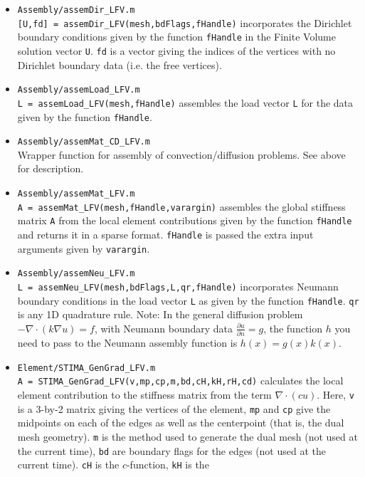 \documentclass[a4paper,10pt]{article}
\begin{document}
\begin{itemize}
\item {\tt Assembly/assemDir\_LFV.m} \\
    {\tt [U,fd] = assemDir\_LFV(mesh,bdFlags,fHandle)} incorporates the
    Dirichlet boundary conditions given by the function {\tt fHandle} in
    the Finite Volume solution vector {\tt U}. {\tt fd} is a vector
    giving the indices of the vertices with no Dirichlet boundary data
    (i.e. the free vertices).
\item {\tt Assembly/assemLoad\_LFV.m} \\
    {\tt L = assemLoad\_LFV(mesh,fHandle)} assembles the load vector {\tt L}
    for the data given by the function {\tt fHandle}.
\item {\tt Assembly/assemMat\_CD\_LFV.m} \\
    Wrapper function for assembly of convection/diffusion problems. See
    above for description.
\item {\tt Assembly/assemMat\_LFV.m} \\
    {\tt A = assemMat\_LFV(mesh,fHandle,varargin)} assembles the global
    stiffness matrix {\tt A} from the local element contributions given
    by the function {\tt fHandle} and returns it in a sparse format.
    {\tt fHandle} is passed the extra input arguments given by {\tt varargin}.
\item {\tt Assembly/assemNeu\_LFV.m} \\
    {\tt L = assemNeu\_LFV(mesh,bdFlags,L,qr,fHandle)} incorporates Neumann
    boundary conditions in the load vector {\tt L} as given by the function
    {\tt fHandle}. {\tt qr} is any 1D quadrature rule. Note: In the general
    diffusion problem $-\nabla\cdot(k\nabla u)=f$, with Neumann boundary data
    $\frac{\partial u}{\partial n}=g$, the function $h$ you need to pass to
    the Neumann assembly function is $h(x)=g(x)k(x)$.
\item {\tt Element/STIMA\_GenGrad\_LFV.m} \\
    {\tt A = STIMA\_GenGrad\_LFV(v,mp,cp,m,bd,cH,kH,rH,cd)} calculates the
    local element contribution to the stiffness matrix from the term
    $\nabla\cdot(cu)$. Here, {\tt v} is a 3-by-2 matrix giving the vertices
    of the element, {\tt mp} and {\tt cp} give the midpoints on each of the
    edges as well as the centerpoint (that is, the dual mesh geometry).
    {\tt m} is the method used to generate the dual mesh (not used at the
    current time), {\tt bd} are boundary flags for the edges (not used
    at the current time). {\tt cH} is the $c$-function, {\tt kH} is the

\end{itemize}
\end{document}
